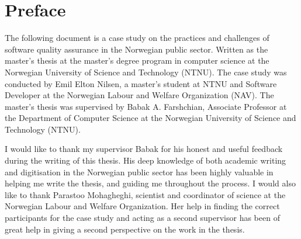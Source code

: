 \chapter*{Preface}
The following document is a case study on the practices and challenges of software quality assurance in the Norwegian public sector. Written as the master's thesis at the master's degree program in computer science at the Norwegian University of Science and Technology (NTNU). The case study was conducted by Emil Elton Nilsen, a master's student at NTNU and Software Developer at the Norwegian Labour and Welfare Organization (NAV). The master's thesis was supervised by Babak A. Farshchian, Associate Professor at the Department of Computer Science at the Norwegian University of Science and Technology (NTNU).

I would like to thank my supervisor Babak for his honest and useful feedback during the writing of this thesis. His deep knowledge of both academic writing and digitisation in the Norwegian public sector has been highly valuable in helping me write the thesis, and guiding me throughout the process. I would also like to thank Parastoo Mohagheghi, scientist and coordinator of science at the Norwegian Labour and Welfare Organization. Her help in finding the correct participants for the case study and acting as a second supervisor has been of great help in giving a second perspective on the work in the thesis.